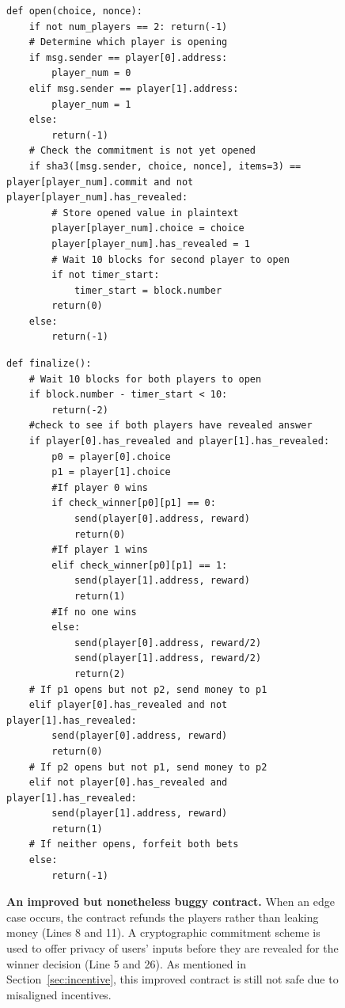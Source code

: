 \documentclass[10pt,twocolumn,letterpaper]{article}
\begin{document}
\begin{figure}
\begin{minipage}{\columnwidth}
\begin{mdframed}
\begin{verbatim}
def open(choice, nonce):
	if not num_players == 2: return(-1)
	# Determine which player is opening
	if msg.sender == player[0].address:
		player_num = 0
	elif msg.sender == player[1].address:
		player_num = 1
	else:
		return(-1)
	# Check the commitment is not yet opened
	if sha3([msg.sender, choice, nonce], items=3) == player[player_num].commit and not player[player_num].has_revealed:
		# Store opened value in plaintext
		player[player_num].choice = choice
		player[player_num].has_revealed = 1		
		# Wait 10 blocks for second player to open
		if not timer_start:
			timer_start = block.number
		return(0)
	else:
		return(-1)
\end{verbatim}
\end{mdframed}
\end{minipage}
%
%
\begin{minipage}{\columnwidth}%
\begin{mdframed}
\begin{verbatim}
def finalize():
	# Wait 10 blocks for both players to open
	if block.number - timer_start < 10: 
		return(-2)
	#check to see if both players have revealed answer
	if player[0].has_revealed and player[1].has_revealed:
		p0 = player[0].choice
		p1 = player[1].choice
		#If player 0 wins
		if check_winner[p0][p1] == 0:
			send(player[0].address, reward)
			return(0)
		#If player 1 wins
		elif check_winner[p0][p1] == 1:
			send(player[1].address, reward)
			return(1)
		#If no one wins
		else:
			send(player[0].address, reward/2)
			send(player[1].address, reward/2)
			return(2)
	# If p1 opens but not p2, send money to p1
	elif player[0].has_revealed and not player[1].has_revealed:
		send(player[0].address, reward)
		return(0)
	# If p2 opens but not p1, send money to p2
	elif not player[0].has_revealed and player[1].has_revealed:
		send(player[1].address, reward)
		return(1)
	# If neither opens, forfeit both bets
	else:
		return(-1)
\end{verbatim}
\end{mdframed}
\end{minipage}%
%
\caption{
\label{fig:nocrypto}
{\bf An improved but nonetheless buggy contract.} 
When an edge case occurs, the contract refunds the players rather than leaking money (Lines 8 and 11). 
A cryptographic commitment scheme is used
to offer privacy of users' inputs before 
they are revealed for the winner decision (Line 5 and 26).
As mentioned in Section~\ref{sec:incentive}, 
this improved contract is still not safe  
due to misaligned incentives.
}
\end{figure}
\end{document}
